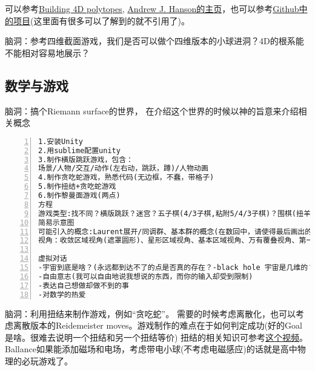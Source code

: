 \documentclass[11pt]{amsart}
\begin{document}
可以参考\href{https://syntopia.github.io/Polytopia/polytopes.html}{Building 4D polytopes}, \href{https://legacy.cs.indiana.edu/~hansona/}{Andrew J. Hanson的主页}，也可以参考\href{https://github.com/wxyhly/4dViewer}{Github中的项目}(这里面有很多可以了解到的就不引用了)。

脑洞：参考四维截面游戏，我们是否可以做个四维版本的小球进洞？4D的根系能不能相对容易地展示？

\subsection{数学与游戏}


脑洞：搞个Riemann surface的世界， 在介绍这个世界的时候以神的旨意来介绍相关概念
\begin{lstlisting}[numbers=left,numberstyle=\tiny,numbersep=10pt]
1.安装Unity
2.用sublime配置unity
3.制作横版跳跃游戏，包含：
场景/人物/交互/动作(左右动，跳跃，蹲)/人物动画
4.制作贪吃蛇游戏，熟悉代码(无边框，不蠢，带格子)
5.制作扭结+贪吃蛇游戏
6.制作黎曼面游戏(两点)
方程
游戏类型:找不同？横版跳跃？迷宫？五子棋(4/3子棋,粘附5/4/3子棋)？围棋(扭羊头游戏)?跳棋？空间爬行？扭结+贪吃蛇？塔防？数独？数回？华容道？ORBOX B?(这玩意可以做成三维版本!4维就有点难了)(mini metro？连连看？泡泡龙？消砖块？2048？推箱子？其他的Nikoli Puzzles？)可查扑克32+世界游戏大全51
简易示意图
可能引入的概念:Laurent展开/同调群、基本群的概念(在数回中，请使得最后画出的曲线表示基本群不平凡但是同调群不平凡)/覆叠，万有覆叠，deck transformation(华容道简化难度:允许deck transformation将区块变换至另一个基本区域中相同的位置；或者，我们允许上下粘接)/曲率/曲率驱动游戏/descent(数独解何时能成为更小的黎曼面的解)
视角：收敛区域视角(遮罩圆形)、星形区域视角、基本区域视角、万有覆叠视角、第一人称视角、二维3D视角(视角需要通过"培训+考试"解锁)

虚拟对话
-宇宙到底是啥？(永远都到达不了的点是否真的存在？-black hole 宇宙是几维的？2+3(颜色)+1(时间) 如何测量时间，or时间的流逝是否是均匀的？)
-自由意志(我可以自由地说我想说的东西，而你的输入却受到限制)
-表达自己想做却做不到的事
-对数学的热爱

\end{lstlisting}

脑洞：利用扭结来制作游戏，例如“贪吃蛇”。 需要的时候考虑离散化，也可以考虑离散版本的Reidemeister moves。游戏制作的难点在于如何判定成功(好的Goal是啥。很难去说明一个扭结和另一个扭结等价)
扭结的相关知识可参考\href{https://www.youtube.com/watch?v=nYz3pRk1cCA}{这个视频}。Ballance如果能添加磁场和电场，考虑带电小球(不考虑电磁感应)的话就是高中物理的必玩游戏了。
\end{document}

